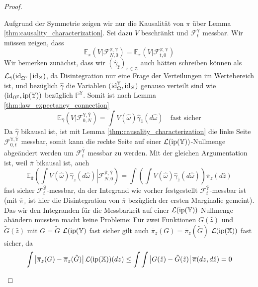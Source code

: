\begin{proof}
\begin{enumerate}[(i)]
Aufgrund der Symmetrie zeigen wir nur die Kausalität von $\pi$ über Lemma \ref{thm:causality_characterization}. Sei dazu $V$ beschränkt und $\mathcal{F}_{t}^{\mathbb{Y}}$ messbar. Wir müssen zeigen, dass 
$$\mathbb{E}_\pi(V \vert \mathcal{F}_{N, 0}^{\mathbb{X}, \mathbb{Y}}) = \mathbb{E}_\pi(V \vert \mathcal{F}_{t, 0}^{\mathbb{X}, \mathbb{Y}})$$
Wir bemerken zunächst, dass wir $(\hat{\gamma}_{\hat{z}})_{\hat{z}\in\mathcal{Z}}$ auch hätten schreiben können als $\mathcal{L}_{\hat{\gamma}}(\operatorname{id}_{\Omega^\mathbb{Y}} \vert \operatorname{id}_{\mathcal{Z}})$, da Disintegration nur eine Frage der Verteilungen im Wertebereich ist, und bezüglich $\hat{\gamma}$ die Variablen $(\operatorname{id}_\Omega^\mathbb{Y}, \operatorname{id}_{\mathcal{Z}})$ genauso verteilt sind wie $(\operatorname{id}_{\Omega^\mathbb{Y}}, \operatorname{ip}(\mathbb{Y}))$ bezüglich $\mathbb{P}^\mathbb{Y}$. Somit ist nach Lemma \ref{thm:law_expectancy_connection}
$$\mathbb{E}_{\hat{\gamma}}(V \vert \mathcal{F}_{0,N}^{\mathbb{Y}, \overline{\mathbb{Y}}}) = \int V(\hat{\omega})\hat{\gamma}_{\hat{z}}(d\hat{\omega}) \quad \text{fast sicher}$$
Da $\hat{\gamma}$ bikausal ist, ist mit Lemma \ref{thm:causality_characterization} die linke Seite $\mathcal{F}_{0,t}^{\mathbb{Y}, \overline{\mathbb{Y}}}$ messbar, somit kann die rechte Seite auf einer $\mathcal{L}(\operatorname{ip}(\mathbb{Y}))$-Nullmenge abgeändert werden um $\mathcal{F}_t^{\overline{\mathbb{Y}}}$ messbar zu werden. Mit der gleichen Argumentation ist, weil $\overline{\pi}$ bikausal ist, auch
$$\mathbb{E}_{\overline{\pi}}\left(\int V(\hat{\omega})\hat{\gamma}_{\hat{z}}(d\hat{\omega}) \left\vert \mathcal{F}_{N,0}^{\overline{\mathbb{X}}, \overline{\mathbb{Y}}}\right.\right)=\int\left(\int V(\hat{\omega})\hat{\gamma}_{\hat{z}}(d\hat{\omega})\right)\overline{\pi}_z(d\hat{z})$$
fast sicher $\mathcal{F}_t^{\overline{\mathbb{X}}}$-messbar, da der Integrand wie vorher festgestellt $\mathcal{F}_t^{\overline{\mathbb{Y}}}$-messbar ist (mit $\overline{\pi}_z$ ist hier die Disintegration von $\overline{\pi}$ bezüglich der ersten Marginalie gemeint). Das wir den Integranden für die Messbarkeit auf einer $\mathcal{L}(\operatorname{ip}(\mathbb{Y}))$-Nullmenge abändern mussten macht keine Probleme: Für zwei Funktionen $G(\hat{z})$ und $\tilde{G}(\hat{z})$ mit $G=\tilde{G}$ $\mathcal{L}(\operatorname{ip}(\mathbb{Y})$ fast sicher gilt auch $\overline{\pi}_z(G) = \overline{\pi}_z(\tilde{G})$ $\mathcal{L}(\operatorname{ip}(\mathbb{X}))$ fast sicher, da
$$\int \left|\overline{\pi}_z(G) - \overline{\pi}_z(\tilde{G})\right| \mathcal{L}(\operatorname{ip}(\mathbb{X}))(dz) \leq \int \int \left|G(\hat{z}) - \tilde{G}(\hat{z})\right| \overline{\pi}(dz, d\hat{z}) = 0$$


\end{enumerate}
\end{proof}
